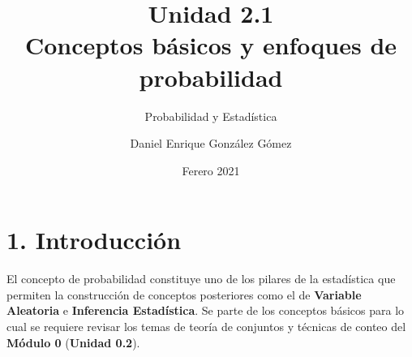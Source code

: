 \documentclass[base=hide,12pt]{elegantbook}
\title{Unidad 2.1 \\
Conceptos básicos y enfoques de probabilidad}
\subtitle{Probabilidad y Estadística}
\author{Daniel Enrique González Gómez}
\institute{Pontificia Universidad Javeriana Cali}
\date{Ferero 2021 }
\begin{document}

\maketitle

\frontmatter
%
\mainmatter

\section*{1. Introducción}

El concepto de probabilidad constituye uno de los  pilares de la estadística que permiten la construcción de  conceptos posteriores como el de  {\bf Variable Aleatoria} e {\bf Inferencia Estadística}. Se parte de  los  conceptos básicos para lo cual se requiere revisar los temas de teoría de  conjuntos y técnicas de conteo del {\bf Módulo 0} ({\bf Unidad 0.2}). \\
\end{document}
